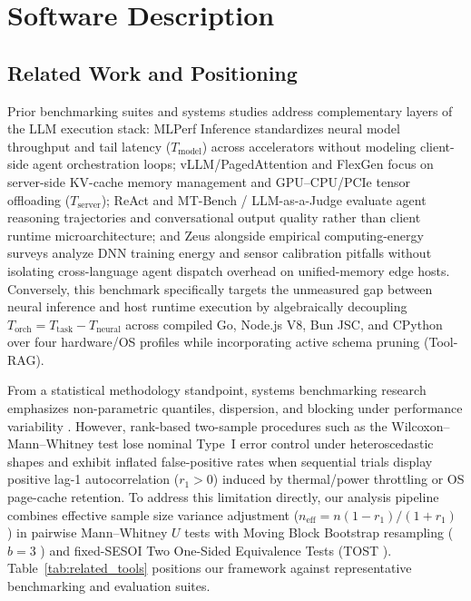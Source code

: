 \documentclass[preprint,12pt,3p]{elsarticle}
\begin{document}
\section{Software Description}
\label{sec:software_description}

\subsection{Related Work and Positioning}
Prior benchmarking suites and systems studies address complementary layers of the LLM execution stack: MLPerf Inference \cite{reddi2020mlperf} standardizes neural model throughput and tail latency ($T_{\text{model}}$) across accelerators without modeling client-side agent orchestration loops; vLLM/PagedAttention \cite{kwon2023vllm} and FlexGen \cite{sheng2023flexgen} focus on server-side KV-cache memory management and GPU--CPU/PCIe tensor offloading ($T_{\text{server}}$); ReAct \cite{yao2023react} and MT-Bench / LLM-as-a-Judge \cite{zheng2023judging} evaluate agent reasoning trajectories and conversational output quality rather than client runtime microarchitecture; and Zeus \cite{you2023zeus} alongside empirical computing-energy surveys \cite{fahad2019comparative} analyze DNN training energy and sensor calibration pitfalls without isolating cross-language agent dispatch overhead on unified-memory edge hosts. Conversely, this benchmark specifically targets the unmeasured gap between neural inference and host runtime execution by algebraically decoupling $T_{\text{orch}} = T_{\text{task}} - T_{\text{neural}}$ across compiled Go, Node.js V8, Bun JSC, and CPython over four hardware/OS profiles while incorporating active schema pruning (Tool-RAG).

From a statistical methodology standpoint, systems benchmarking research emphasizes non-parametric quantiles, dispersion, and blocking under performance variability \cite{kalibera2013rigorous, hoefler2015scientific, maricq2018taming, weaver2013nondeterminism}. However, rank-based two-sample procedures such as the Wilcoxon--Mann--Whitney test \cite{mann1947test} lose nominal Type~I error control under heteroscedastic shapes \cite{zimmerman1993rank, fagerland2009wilcoxon} and exhibit inflated false-positive rates when sequential trials display positive lag-1 autocorrelation ($r_1 > 0$) induced by thermal/power throttling or OS page-cache retention. To address this limitation directly, our analysis pipeline combines effective sample size variance adjustment ($n_{\text{eff}} = n(1-r_1)/(1+r_1)$ \cite{bayley1946effective, yue2004mann}) in pairwise Mann--Whitney $U$ tests with Moving Block Bootstrap resampling ($b=3$ \cite{kuensch1989jackknife}) and fixed-SESOI Two One-Sided Equivalence Tests (TOST \cite{schuirmann1987comparison, lakens2017equivalence}). Table~\ref{tab:related_tools} positions our framework against representative benchmarking and evaluation suites.
\end{document}

